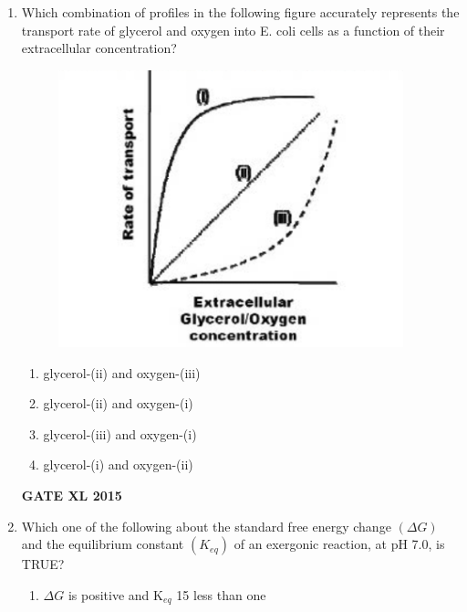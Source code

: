 \documentclass[journal,12pt,onecolumn]{IEEEtran}
\begin{document}
\begin{enumerate}
(R) Phage P22 is a specialized transducing phage

(S) Phage lambda (2) is a specialized transducing phage
    \begin{enumerate}
            \item P and S only
	    \item Q and R only
	    \item Q and S only
            \item P and R only
    \end{enumerate}
\hfill{\textbf{GATE XL 2015}}
\item Which combination of profiles in the following figure accurately represents the transport rate of glycerol and oxygen into E. coli cells as a function of their extracellular concentration?


	\begin{figure}[h!]
		\centering
	\includegraphics[width=10cm]{77}
		    \caption*{}
		\label{fig:Q77}
	\end{figure}
    \begin{enumerate}
	    \item glycerol-(ii) and oxygen-(iii)
	    \item glycerol-(ii) and oxygen-(i)
	    \item glycerol-(iii) and oxygen-(i)
	    \item glycerol-(i) and oxygen-(ii)
    \end{enumerate}
\hfill{\textbf{GATE XL 2015}}
\item Which one of the following about the standard free energy change $(\Delta G)$ and the equilibrium constant $(K_{eq})$ of an exergonic reaction, at pH 7.0, is TRUE?
    \begin{enumerate}
            \item $\Delta G$ is positive and K$_{eq}$ 15 less than one

\end{enumerate}
\end{enumerate}
\end{document}
